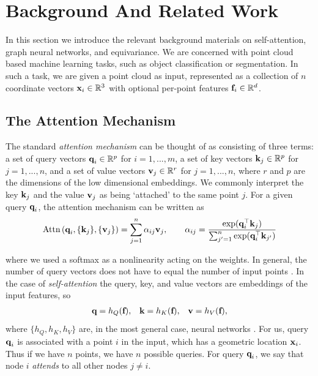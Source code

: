 \documentclass{article}
\begin{document}
\section{Background And Related Work}
In this section we introduce the relevant background materials on self-attention, graph neural networks, and equivariance. We are concerned with point cloud based machine learning tasks, such as object classification or segmentation. In such a task, we are given a point cloud as input, represented as a collection of $n$ coordinate vectors $\textbf{x}_i \in \mathbb{R}^{3}$ with optional per-point features $\textbf{f}_i \in \mathbb{R}^{d}$. 

\subsection{The Attention Mechanism}
The standard \emph{attention mechanism} \citep{VaswaniSPUJGKP17} can be thought of as consisting of three terms: a set of query vectors $\textbf{q}_i \in \mathbb{R}^p$ for $i=1,...,m$, a set of key vectors $\textbf{k}_j \in \mathbb{R}^{p}$ for $j=1,...,n$, and a set of value vectors $\textbf{v}_j \in \mathbb{R}^{r}$ for $j=1,...,n$, where $r$ and $p$ are the dimensions of the low dimensional embeddings. We commonly interpret the key $\textbf{k}_j$ and the value $\textbf{v}_j$ as being `attached' to the same point $j$. For a given query $\textbf{q}_i$, the attention mechanism can be written as
\begin{align}
	\text{Attn}\left(\textbf{q}_i, \{\textbf{k}_j\}, \{\textbf{v}_j\}\right) = \sum_{j=1}^n \alpha_{ij} \textbf{v}_j, \qquad \alpha_{ij} = \frac{\exp(\textbf{q}_i^{\top} \textbf{k}_j)}{\sum_{j'=1}^n \exp(\textbf{q}_i^{\top} \textbf{k}_{j'})} \label{eq:self-attention}
\end{align}

where we used a softmax as a nonlinearity acting on the weights.
In general, the number of query vectors does not have to equal the number of input points \citep{SetTransformer}. In the case of \emph{self-attention} the query, key, and value vectors are embeddings of the input features, so
\begin{align}
	\textbf{q} = h_Q(\textbf{f}), && \textbf{k} = h_K(\textbf{f}), && \textbf{v} = h_V(\textbf{f}), \label{eq:embeddings}
\end{align}
where $\{h_Q, h_K, h_V\}$ are, in the most general case, neural networks \citep{steenkiste2018relational}. For us, query $\textbf{q}_i$ is associated with a point $i$ in the input, which has a geometric location $\textbf{x}_i$. Thus if we have $n$ points, we have $n$ possible queries. For query $\textbf{q}_i$, we say that node $i$ \emph{attends} to all other nodes $j \neq i$.
\end{document}
